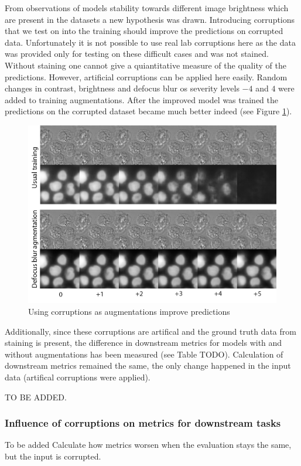 From observations of models stability towards different image brightness which are present in the datasets a new hypothesis was drawn. Introducing corruptions that we test on into the training should improve the predictions on corrupted data. Unfortunately it is not possible to use real lab corruptions here as the data was provided only for testing on these difficult cases and was not stained. Without staining one cannot give a quiantitative measure of the quality of the predictions. However, artificial corruptions can be applied here easily. Random changes in contrast, brightness and defocus blur os severity levels $-4$ and $4$ were added to training augmentations. After the improved model was trained the predictions on the corrupted dataset became much better indeed (see Figure \ref{fig:augments-help}).

\begin{figure}[htb]
	\begin{center}
		\includegraphics[width=0.4\linewidth]{bilder/stability/augments-help.png}
		\caption{Using corruptions as augmentations improve predictions}\label{fig:augments-help}
	\end{center}
\end{figure}

Additionally, since these corruptions are artifical and the ground truth data from staining is present, the difference in downstream metrics for models with and without augmentations has been measured (see Table TODO). Calculation of downstream metrics remained the same, the only change happened in the input data (artifical corruptions were applied).

TO BE ADDED.

\subsubsection{Influence of corruptions on metrics for downstream tasks}
To be added
Calculate how metrics worsen when the evaluation stays the same, but the input is corrupted.
